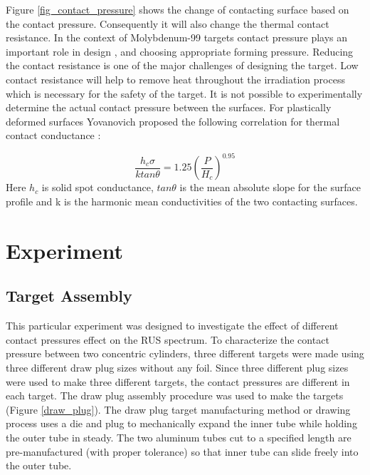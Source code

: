 \begin{doublespacing}
Figure \ref{fig_contact_pressure} shows the change of contacting surface based on the contact pressure. Consequently it will also change the thermal contact resistance. In the context of Molybdenum-99 targets contact pressure plays an important role in design \cite{philip}, and choosing appropriate forming pressure. Reducing the contact resistance is one of the major challenges of designing the target. Low contact resistance will help to remove heat throughout the irradiation process  which is necessary for the safety of the target. It is not possible to experimentally determine the actual contact pressure between the surfaces. For plastically deformed surfaces Yovanovich \cite{madhusudana1996thermal} proposed the following correlation for thermal contact conductance :

\begin{equation}
\label{eq_yavonovich}
\frac{h_c \sigma}{k tan\theta} = 1.25 \left( \frac{P}{H_c}\right)^{0.95}
\end{equation}
Here $h_c$ is solid spot conductance, $tan\theta$ is the mean absolute slope for the surface profile and k is the harmonic mean conductivities of the two contacting surfaces.




\section{Experiment}
\subsection{Target Assembly}
This particular experiment was designed to investigate the effect of different contact pressures effect on the RUS spectrum. To characterize the contact pressure between two concentric cylinders, three different targets were made using three different draw plug sizes without any foil. Since three different plug sizes were used to make three different targets, the contact pressures are different in each target. The draw plug assembly procedure was used to make the targets (Figure \ref{draw_plug}). The draw plug target manufacturing method or drawing process uses a die and plug to mechanically expand the inner tube while holding the outer tube in steady. The two aluminum tubes cut to a specified length are pre-manufactured (with proper tolerance) so that inner tube can slide freely into the outer tube. 


\end{doublespacing}
